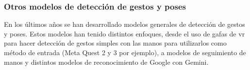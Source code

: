 \subsubsection{Otros modelos de detección de gestos y poses}

En los últimos años se han desarrollado modelos generales de detección de gestos y poses. Estos modelos han tenido distintos enfoques, desde el uso de gafas de \gls{vr} para hacer detección de gestos simples con las manos para utilizarlos como método de entrada (Meta Quest 2 y 3 por ejemplo), a modelos de seguimiento de manos y distintos modelos de reconocimiento de Google con Gemini.